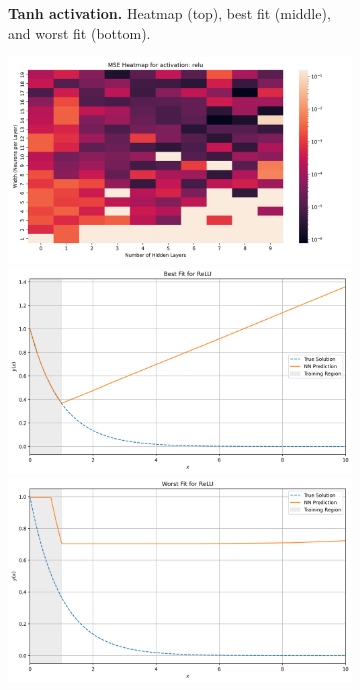 \begin{figure}[ht]
\begin{subfigure}[t]{0.48\textwidth}
        \caption{\textbf{Tanh activation.} Heatmap (top), best fit (middle), and worst fit (bottom).}
        \label{fig:expdecay_tanh_column}
    \end{subfigure}
    \hspace*{\fill}
    \begin{subfigure}[t]{0.48\textwidth}
        \centering
        \includegraphics[width=\textwidth]{graphics/mse_heatmap_relu.png}
        \includegraphics[width=\textwidth]{graphics/best_fit_relu_7layers_14width.png}
        \includegraphics[width=\textwidth]{graphics/worst_fit_relu_7layers_8width.png}

\end{subfigure}
\end{figure}
